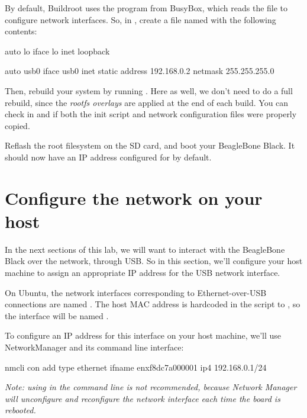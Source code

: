 By default, Buildroot uses the  program from BusyBox, which
reads the  file to configure network
interfaces. So, in ,
create a file named  with the following
contents:

\begin{fileinput}
auto lo
iface lo inet loopback

auto usb0
iface usb0 inet static
      address 192.168.0.2
      netmask 255.255.255.0
\end{fileinput}

Then, rebuild your system by running . Here as well, we
don't need to do a full rebuild, since the {\em rootfs overlays} are
applied at the end of each build. You can check in
 and 
if both the init script and network configuration files were properly
copied.

Reflash the root filesystem on the SD card, and boot your BeagleBone
Black. It should now have an IP address configured for  by
default.

\section{Configure the network on your host}

In the next sections of this lab, we will want to interact with the
BeagleBone Black over the network, through USB. So in this section,
we'll configure your host machine to assign an appropriate IP address
for the USB network interface.

On Ubuntu, the network interfaces corresponding to Ethernet-over-USB
connections are named . The host MAC address is
hardcoded in the  script to
, so the interface will be named
.

To configure an IP address for this interface on your host machine,
we'll use NetworkManager and its command line interface:

\begin{bashinput}
nmcli con add type ethernet ifname enxf8dc7a000001 ip4 192.168.0.1/24
\end{bashinput}

{\em Note: using  in the command line is not
recommended, because Network Manager will unconfigure and
reconfigure the network interface each time the board is rebooted.}

